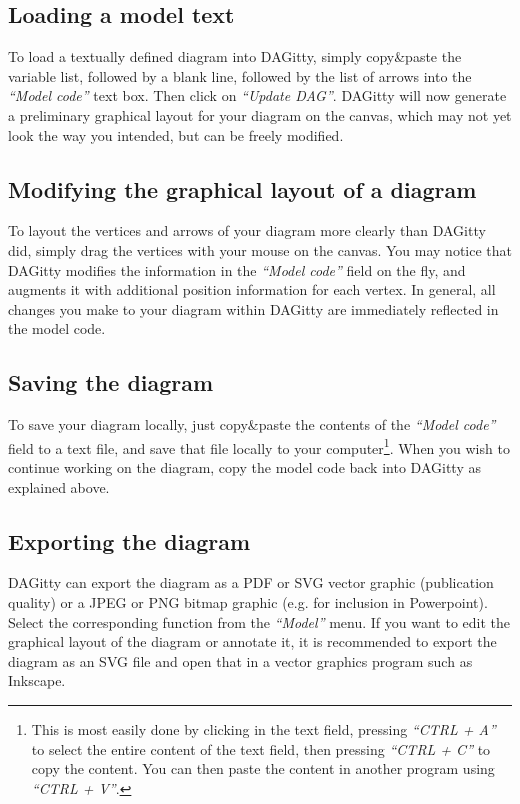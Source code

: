 \documentclass[a4paper]{article} %
\newcommand{\pp}{{\sc DAG}itty\xspace}
\newcommand{\action}[1]{\emph{``#1''}}
\begin{document}
\subsection{Loading a model text}

To load a textually defined diagram into \pp, simply copy\&paste the 
variable list, followed by a blank line,
followed by the list of arrows into the \action{Model code} text
box. Then click on \action{Update DAG}.
\pp will now generate a preliminary graphical layout for your diagram on 
the canvas, which may not yet look the way you intended, but can be freely 
modified.

\subsection{Modifying the graphical layout of a diagram}

To layout the vertices and arrows of your diagram more clearly than \pp
did, simply drag the vertices with your mouse on the canvas. You may notice
that \pp modifies the information in the \action{Model code} field
on the fly, and augments it with additional position information for each
vertex. In general, all changes you make to your diagram within \pp 
are immediately reflected in the model code. 

\subsection{Saving the diagram} 

To save your diagram locally, just copy\&paste the contents of the \action{Model code}
field to a text file, 
and save that file locally to your computer\footnote{This is most easily done
by clicking in the text field, pressing \action{CTRL + A} to select the entire content
of the text field, then pressing \action{CTRL + C} to copy the content. You
can then paste the content in another program using \action{CTRL + V}.}.
When you wish to continue working on the
diagram, copy the model code back into \pp as explained above. 

\subsection{Exporting the diagram}

\pp can export the diagram as a PDF or SVG vector graphic (publication quality)
or a JPEG or PNG bitmap graphic (e.g. for inclusion in Powerpoint). Select the
corresponding function from the \action{Model} menu. If you want to edit the graphical
layout of the diagram or annotate it, it is recommended to export the diagram as an
SVG file and open that in a vector graphics program such as Inkscape.
\end{document}
